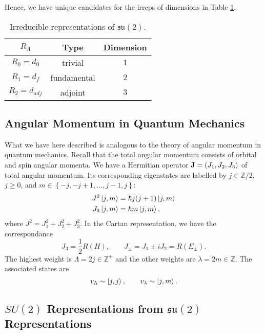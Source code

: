 Hence, we have unique candidates for the irreps of dimensions in Table \ref{tab:12-reps}.
\begin{table}[htpb]
  \centering
  \begin{tabular}{|c|c|c|}
    \hline
    $R_\Lambda$ & Type & Dimension \\
     \hline
    $R_0 = d_0$ & trivial & $1$  \\
    $R_1 = d_f$ & fundamental & $2$ \\
    $R_2 = d_{adj}$ & adjoint & $3$ \\
    \hline
  \end{tabular}
  \caption{Irreducible representations of $\mathfrak{su}(2)$.}
  \label{tab:12-reps}
\end{table}

\subsection{Angular Momentum in Quantum Mechanics}%
\label{sub:angular_momentum_in_quantum_mechanics}

What we have here described is analogous to the theory of angular momentum in quantum mechanics.
Recall that the total angular momentum consists of orbital and spin angular momenta.
We have a Hermitian operator $\vb{J} = (J_1, J_2, J_3)$ of total angular momentum.
Its corresponding eigenstates are labelled by $j \in \mathbb{Z}/2$, $j \geq 0$, and $m \in \left\{ -j, -j + 1, \dots, j-1, j \right\}$:
\begin{align}
  J^2 \ket{j, m} &= \hbar j (j+1) \ket{j, m}  \\
  J_3 \ket{j, m} &= \hbar m \ket{j, m},
\end{align}
where $J^2 = J_1^2 + J_2^2 + J_3^2$.
In the Cartan representation, we have the correspondance
\begin{equation}
  J_3 = \frac{1}{2} R(H), \qquad
  J_\pm = J_1 \pm i J_2 = R(E_\pm).
\end{equation}
The highest weight is $\Lambda = 2 j \in \mathbb{Z}^+$ and the other weights are $\lambda = 2m \in \mathbb{Z}$. The associated states are
\begin{equation}
  v_\Lambda \sim \ket{j, j}, \qquad v_\lambda \sim \ket{j, m}.
\end{equation}

\subsection{\texorpdfstring{$SU(2)$}{SU(2)} Representations from \texorpdfstring{$\mathfrak{su}(2)$}{its Lie algebra's} Representations}%
\label{sub:su2-reps-from-lsu2-reps}

